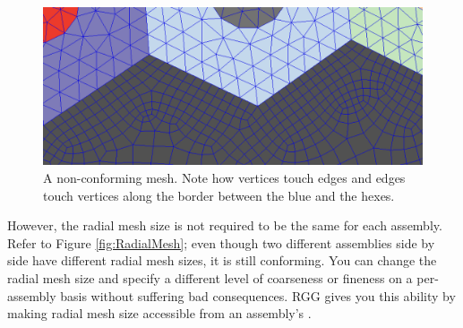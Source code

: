 \begin{figure}[H]
	\begin{center}
		\includegraphics[width=\linewidth]{Images/nonconforming-mesh.png}
		\caption{A non-conforming mesh.  Note how vertices touch edges and edges touch vertices along the border between the blue and the hexes.}
		\label{fig:NonconformingMesh}
	\end{center}
\end{figure}

However, the radial mesh size is not required to be the same for each assembly.  Refer to Figure \ref{fig:RadialMesh}; even though two different assemblies side by side have different radial mesh sizes, it is still conforming. You can change the radial mesh size and specify a different level of coarseness or fineness on a per-assembly basis without suffering bad consequences.  RGG gives you this ability by making radial mesh size accessible from an assembly's .